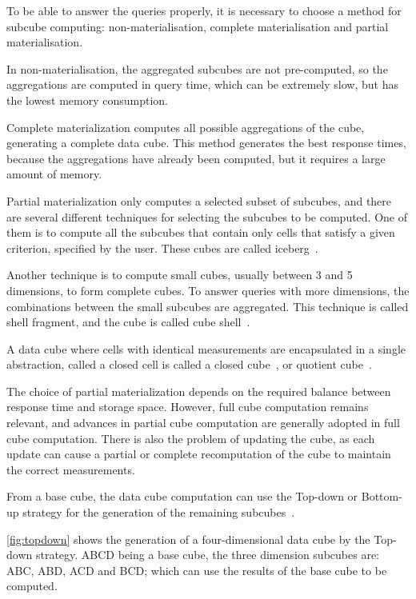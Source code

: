 To be able to answer the queries properly, it is necessary to choose a method for subcube computing: non-materialisation, complete materialisation and partial materialisation.

In non-materialisation, the aggregated subcubes are not pre-computed, so the aggregations are computed in query time, which can be extremely slow, but has the lowest memory consumption.

Complete materialization computes all possible aggregations of the cube, generating a complete data cube.
This method generates the best response times, because the aggregations have already been computed, but it requires a large amount of memory.

Partial materialization only computes a selected subset of subcubes, and there are several different techniques for selecting the subcubes to be computed.
One of them is to compute all the subcubes that contain only cells that satisfy a given criterion, specified by the user.
These cubes are called iceberg~\cite{beyerBottomupComputationSparse1999}.

Another technique is to compute small cubes, usually between 3 and 5 dimensions, to form complete cubes.
To answer queries with more dimensions, the combinations between the small subcubes are aggregated.
This technique is called shell fragment, and the cube is called cube shell~\cite{liHighdimensionalOLAPMinimal2004}.

A data cube where cells with identical measurements are encapsulated in a single abstraction, called a closed cell is called a closed cube~\cite{dongxinCCubingEfficientComputation2006}, or quotient cube~\cite{lakshmananQuotientCubeHow2002}.

The choice of partial materialization depends on the required balance between response time and storage space.
However, full cube computation remains relevant, and advances in partial cube computation are generally adopted in full cube computation.
There is also the problem of updating the cube, as each update can cause a partial or complete recomputation of the cube to maintain the correct measurements.

From a base cube, the data cube computation can use the Top-down or Bottom-up strategy for the generation of the remaining subcubes~\cite{hanDataMiningConcepts2011}.

\autoref{fig:topdown} shows the generation of a four-dimensional data cube by the Top-down strategy.
ABCD being a base cube, the three dimension subcubes are: ABC, ABD, ACD and BCD; which can use the results of the base cube to be computed.

